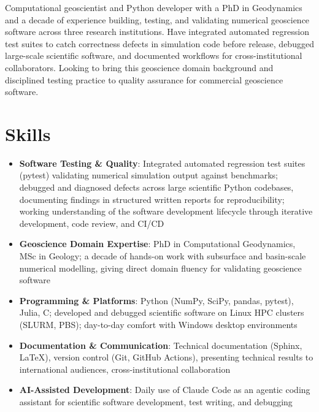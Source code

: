 \documentclass[11pt,a4paper,sans]{moderncv}
\begin{document}
\makecvtitle


\vspace{6pt}
\small{Computational geoscientist and Python developer with a PhD in Geodynamics and a decade of experience building, testing, and validating numerical geoscience software across three research institutions. Have integrated automated regression test suites to catch correctness defects in simulation code before release, debugged large-scale scientific software, and documented workflows for cross-institutional collaborators. Looking to bring this geoscience domain background and disciplined testing practice to quality assurance for commercial geoscience software.}


\section{Skills}
\vspace{1pt}
\begin{itemize}

\item \textbf{Software Testing \& Quality}: Integrated automated regression test suites (pytest) validating numerical simulation output against benchmarks; debugged and diagnosed defects across large scientific Python codebases, documenting findings in structured written reports for reproducibility; working understanding of the software development lifecycle through iterative development, code review, and CI/CD

\item \textbf{Geoscience Domain Expertise}: PhD in Computational Geodynamics, MSc in Geology; a decade of hands-on work with subsurface and basin-scale numerical modelling, giving direct domain fluency for validating geoscience software

\item \textbf{Programming \& Platforms}: Python (NumPy, SciPy, pandas, pytest), Julia, C; developed and debugged scientific software on Linux HPC clusters (SLURM, PBS); day-to-day comfort with Windows desktop environments

\item \textbf{Documentation \& Communication}: Technical documentation (Sphinx, LaTeX), version control (Git, GitHub Actions), presenting technical results to international audiences, cross-institutional collaboration

\item \textbf{AI-Assisted Development}: Daily use of Claude Code as an agentic coding assistant for scientific software development, test writing, and debugging

\end{itemize}
\end{document}
